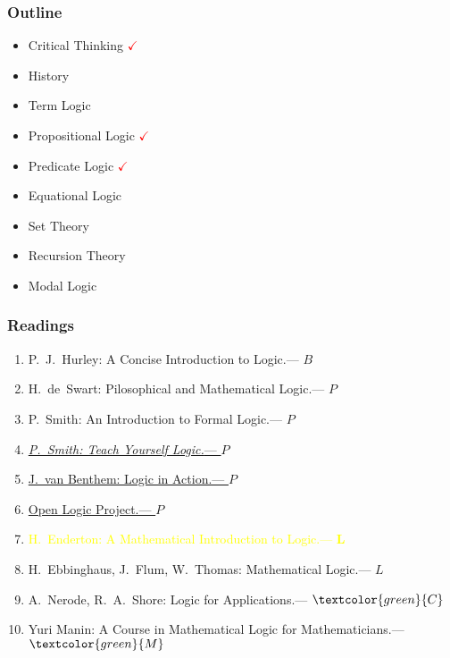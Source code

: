\documentclass[UTF8,11pt,colorlinks,compress,openany]{beamer}%
\begin{document}
\begin{frame}\frametitle{Outline}
	\begin{itemize}
		\item Critical Thinking \textcolor{red}{$\checkmark$}
		\item History
		\item Term Logic
		\item Propositional Logic \textcolor{red}{$\checkmark$}
		\item Predicate Logic \textcolor{red}{$\checkmark$}
		\item Equational Logic
		\item Set Theory
		\item Recursion Theory
		\item Modal Logic
	\end{itemize}
\end{frame}

\begin{frame}\frametitle{Readings}
		\begin{enumerate}
			\item P.~J.~Hurley: A Concise Introduction to Logic.\hfill --- $B$
			\item H.~de~Swart: Pilosophical and Mathematical Logic.\hfill --- $P$
			\item P.~Smith: An Introduction to Formal Logic.\hfill --- $P$
			\item \href{http://www.logicmatters.net/tyl}{\emph{P.~Smith: Teach Yourself Logic.}\hfill --- $P$}
			\item \href{http://www.logicinaction.org}{J.~van Benthem: Logic in Action.\hfill --- $P$}
			\item \href{http://builds.openlogicproject.org}{Open Logic Project.\hfill --- $P$}
			\item \textcolor{yellow}{H.~Enderton: A Mathematical Introduction to Logic.\hfill --- $\textbf{L}$}
			\item H.~Ebbinghaus, J.~Flum, W.~Thomas: Mathematical Logic.\hfill --- $L$
			\item A.~Nerode, R.~A.~Shore: Logic for Applications.\hfill --- $\textcolor{green}{C}$
			\item Yuri Manin: A Course in Mathematical Logic for Mathematicians.\hfill --- $\textcolor{green}{M}$
		\end{enumerate}
\end{frame}
\end{document}
